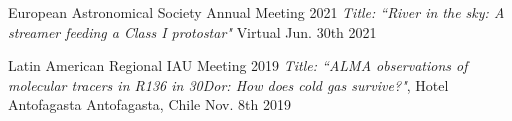 \begin{cvhonors}
  \cvhonor
    {European Astronomical Society Annual Meeting 2021} %
    {\textit{Title: ``River in the sky: A streamer feeding a Class I protostar"}} %
    {Virtual} %
    {Jun. 30th 2021} %

  \cvhonor
    {Latin American Regional IAU Meeting 2019} %
    {\textit{Title: ``ALMA observations of molecular tracers in R136 in 30Dor: How does cold gas survive?"}, Hotel Antofagasta} %
    {Antofagasta, Chile} %
    {Nov. 8th 2019} %

\end{cvhonors}

